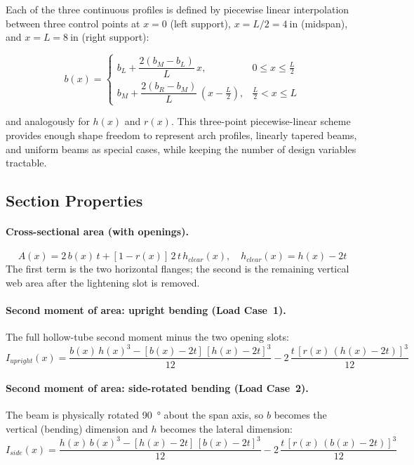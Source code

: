 \documentclass[11pt,letterpaper]{article}
\begin{document}
Each of the three continuous profiles is defined by piecewise linear
interpolation between three control points at $x = 0$ (left support),
$x = L/2 = 4\ \mathrm{in}$ (midspan), and $x = L = 8\ \mathrm{in}$
(right support):

\[
  b(x) = \begin{cases}
    b_L + \dfrac{2(b_M - b_L)}{L}\,x, & 0 \le x \le \tfrac{L}{2} \\[6pt]
    b_M + \dfrac{2(b_R - b_M)}{L}\,(x - \tfrac{L}{2}), & \tfrac{L}{2} < x \le L
  \end{cases}
\]

and analogously for $h(x)$ and $r(x)$.  This three-point piecewise-linear
scheme provides enough shape freedom to represent arch profiles, linearly
tapered beams, and uniform beams as special cases, while keeping the number
of design variables tractable.

\subsection{Section Properties}

\paragraph{Cross-sectional area (with openings).}
\[
  A(x) = 2\,b(x)\,t + [1 - r(x)]\,2\,t\,h_{clear}(x),
  \quad h_{clear}(x) = h(x) - 2t
\]
The first term is the two horizontal flanges; the second is the remaining
vertical web area after the lightening slot is removed.

\paragraph{Second moment of area: upright bending (Load Case~1).}
The full hollow-tube second moment minus the two opening slots:
\[
  I_{upright}(x) = \frac{b(x)\,h(x)^3 - [b(x)-2t]\,[h(x)-2t]^3}{12}
  - 2\,\frac{t\,[r(x)\,(h(x)-2t)]^3}{12}
\]

\paragraph{Second moment of area: side-rotated bending (Load Case~2).}
The beam is physically rotated \SI{90}{\degree} about the span axis, so $b$
becomes the vertical (bending) dimension and $h$ becomes the lateral dimension:
\[
  I_{side}(x) = \frac{h(x)\,b(x)^3 - [h(x)-2t]\,[b(x)-2t]^3}{12}
  - 2\,\frac{t\,[r(x)\,(b(x)-2t)]^3}{12}
\]
\end{document}

